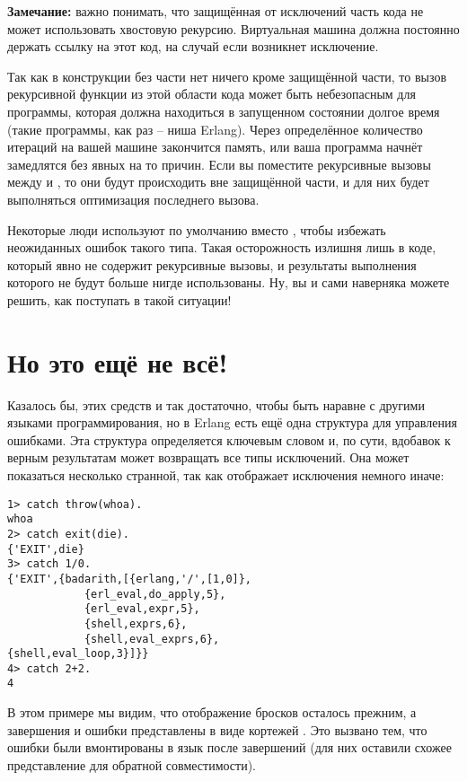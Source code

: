 \colorbox{lgray}
{
\begin{minipage}{1.0\linewidth}
    \textbf{Замечание:} важно понимать, что защищённая от исключений часть кода не может использовать хвостовую рекурсию.
    Виртуальная машина должна постоянно держать ссылку на этот код, на случай если возникнет исключение.

    Так как в конструкции  без части  нет ничего кроме защищённой части, то вызов рекурсивной функции из этой области кода может быть небезопасным для программы, которая должна находиться в запущенном состоянии долгое время (такие программы, как раз \--- ниша Erlang).
    Через определённое количество итераций на вашей машине закончится память, или ваша программа начнёт замедлятся без явных на то причин.
    Если вы поместите рекурсивные вызовы между  и , то они будут происходить вне защищённой части, и для них будет выполняться оптимизация последнего вызова.

    Некоторые люди  используют по умолчанию  вместо , чтобы избежать неожиданных ошибок такого типа.
    Такая осторожность излишня лишь в коде, который явно не содержит рекурсивные вызовы, и результаты выполнения которого не будут больше нигде использованы. Ну, вы и сами наверняка можете решить, как поступать в такой ситуации!
\end{minipage}
}
\section{Но это ещё не всё!}
\label{wait-theres-more}
Казалось бы, этих средств и так достаточно, чтобы быть наравне с другими языками программирования, но в Erlang есть ещё одна структура для управления ошибками.
Эта структура определяется ключевым словом  и, по сути, вдобавок к верным результатам может возвращать все типы исключений.
Она может показаться несколько странной, так как отображает исключения немного иначе:
\begin{lstlisting}[style=erlang]
1> catch throw(whoa).
whoa
2> catch exit(die).
{'EXIT',die}
3> catch 1/0.
{'EXIT',{badarith,[{erlang,'/',[1,0]},
            {erl_eval,do_apply,5},
            {erl_eval,expr,5},
            {shell,exprs,6},
            {shell,eval_exprs,6},
{shell,eval_loop,3}]}}
4> catch 2+2.
4
\end{lstlisting}

В этом примере мы видим, что отображение бросков осталось прежним, а завершения и ошибки представлены в виде кортежей .
Это вызвано тем, что ошибки были вмонтированы в язык после завершений (для них оставили схожее представление для обратной совместимости).

